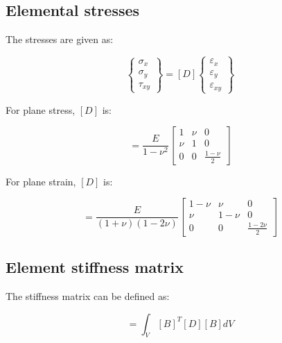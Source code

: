 \subsection{Elemental stresses}
The stresses are given as: 

\begin{equation}
\left\lbrace \begin{array}{c}
\sigma_x \\
\sigma_y \\
\tau_{xy}
\end{array} \right\rbrace = [D] \left\lbrace \begin{array}{c}
\varepsilon_x \\
\varepsilon_y \\
\varepsilon_{xy}
\end{array} \right\rbrace
\end{equation}

For plane stress, $ [D] $ is:

\begin{equation}
[D] = \frac{E}{1-\nu^2} \begin{bmatrix}
1 & \nu & 0 \\
\nu & 1 & 0 \\
0 & 0 & \frac{1-\nu}{2}
\end{bmatrix}
\end{equation}

For plane strain, $ [D] $ is:

\begin{equation}
[D] = \frac{E}{(1+\nu)(1-2\nu)} \begin{bmatrix}
1-\nu & \nu & 0 \\
\nu & 1-\nu & 0 \\
0 & 0 & \frac{1-2\nu}{2}
\end{bmatrix}
\end{equation}

\subsection{Element stiffness matrix}
The stiffness matrix can be defined as:

\begin{equation}
[k] = \int_V [B]^T [D] [B] dV
\end{equation}